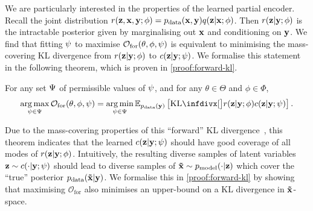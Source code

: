 We are particularly interested in the properties of the learned partial encoder.
Recall the joint distribution $r(\mathbf{z}{}, \mathbf{x}{}, \mathbf{y}{}; \phi) = p_{\rm{data}}{}(\mathbf{x}{},
\mathbf{y}{})q(\mathbf{z}{}|\mathbf{x}{}; \phi)$. Then $r(\mathbf{z}{}|\mathbf{y}{}; \phi)$ is the intractable
posterior given by marginalising out $\mathbf{x}{}$ and conditioning on $\mathbf{y}{}$. We
find that fitting $\psi{}$ to maximise $\mathcal{O}_\mathrm{for}(\theta,
\phi, \psi{})$ is equivalent to minimising the mass-covering KL divergence
from $r(\mathbf{z}{}|\mathbf{y}{}; \phi)$ to $c{}(\mathbf{z}{}|\mathbf{y}{}; \psi)$. We formalise
this statement in the following theorem, which is proven in
\cref{proof:forward-kl}.
\begin{theorem} \label{theorem:forward-kl} For any set $\Psi$ of
  permissible values of $\psi{}$, and for any $\theta\in\Theta$ and
  $\phi\in\Phi$,
  \begin{equation} \label{eq:forward-theorem}
    \argmax_{\partphi{} \in \Partphi} \mathcal{O}_\mathrm{for}(\theta, \phi, \partphi{}) = \argmin_{\partphi{} \in \Partphi} \EX_{\pdata{}(\partI{})} \left[ \kl[\big]{ r(\z{}|\partI{}; \phi) }{ \partq{}(\z{}|\partI{}; \partphi) } \right].
  \end{equation}
\end{theorem}
Due to the mass-covering properties of this ``forward'' KL
divergence~\citep{bishop2006pattern}, this theorem indicates that 
%
%
the learned $c{}(\mathbf{z}{}|\mathbf{y}{}; \psi)$ should have good coverage of all
modes of $r(\mathbf{z}{}|\mathbf{y}{}; \phi)$. Intuitively, the resulting diverse samples of
latent variables $\mathbf{z}{}\sim c{}(\cdot|\mathbf{y}{}; \psi)$ should lead to
diverse samples of $\mathbf{\tilde{x}}{} \sim p_{\rm{model}}{}(\cdot|\mathbf{z}{})$ which cover the
``true'' posterior $p_{\rm{data}}{}(\mathbf{\tilde{x}}{}|\mathbf{y}{})$. We formalise this in
\cref{proof:forward-kl} by showing that maximising $\mathcal{O}_\mathrm{for}$
also minimises an upper-bound on a KL divergence in $\mathbf{\tilde{x}}{}$-space.


